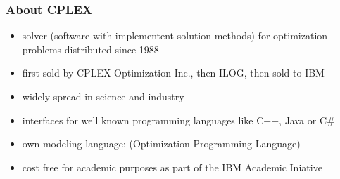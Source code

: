 \begin{frame}
 \frametitle{About CPLEX}
 \begin{itemize}
  \item solver (software with implementent solution methods) for optimization problems distributed since 1988
  \item first sold by CPLEX Optimization Inc., then ILOG, then sold to IBM
  \item widely spread in science and industry
  \item interfaces for well known programming languages like C++, Java or C\#
  \item own modeling language:  (Optimization Programming Language)
  \item cost free for academic purposes as part of the IBM Academic Iniative 
 \end{itemize}
\end{frame}
